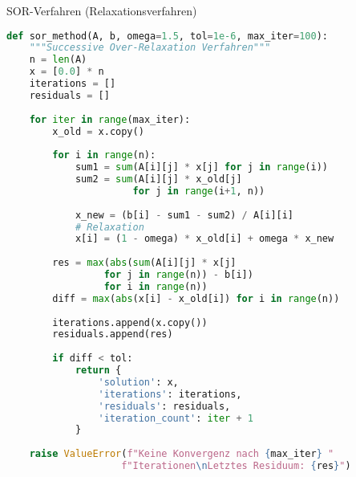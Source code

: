 \begin{examplecode}{SOR-Verfahren (Relaxationsverfahren)}
\begin{lstlisting}[language=Python, style=basesmol]
def sor_method(A, b, omega=1.5, tol=1e-6, max_iter=100):
    """Successive Over-Relaxation Verfahren"""
    n = len(A)
    x = [0.0] * n
    iterations = []
    residuals = []
    
    for iter in range(max_iter):
        x_old = x.copy()
        
        for i in range(n):
            sum1 = sum(A[i][j] * x[j] for j in range(i))
            sum2 = sum(A[i][j] * x_old[j] 
                      for j in range(i+1, n))
            
            x_new = (b[i] - sum1 - sum2) / A[i][i]
            # Relaxation
            x[i] = (1 - omega) * x_old[i] + omega * x_new
            
        res = max(abs(sum(A[i][j] * x[j] 
                 for j in range(n)) - b[i]) 
                 for i in range(n))
        diff = max(abs(x[i] - x_old[i]) for i in range(n))
        
        iterations.append(x.copy())
        residuals.append(res)
        
        if diff < tol:
            return {
                'solution': x,
                'iterations': iterations,
                'residuals': residuals,
                'iteration_count': iter + 1
            }
            
    raise ValueError(f"Keine Konvergenz nach {max_iter} "
                    f"Iterationen\nLetztes Residuum: {res}")
\end{lstlisting}
\end{examplecode}


